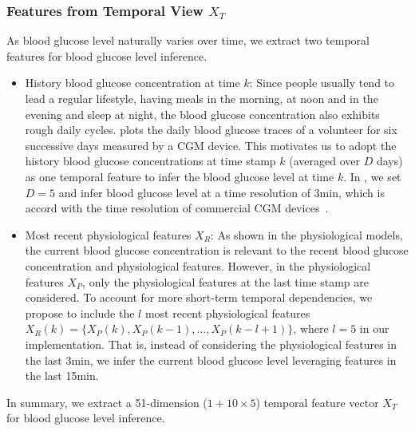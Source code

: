\subsubsection{Features from Temporal View $X_T$}
As blood glucose level naturally varies over time, we extract two temporal features for blood glucose level inference.
\begin{itemize}
  \item
  History blood glucose concentration at time $k$: 
  Since people usually tend to lead a regular lifestyle, \eg having meals in the morning, at noon and in the evening and sleep at night, the blood glucose concentration also exhibits rough daily cycles.
   plots the daily blood glucose traces of a volunteer for six successive days measured by a CGM device.
  This motivates us to adopt the history blood glucose concentrations at time stamp $k$ (averaged over $D$ days) as one temporal feature to infer the blood glucose level at time $k$.
  In \sysname, we set $D=5$ and infer blood glucose level at a time resolution of 3min, which is accord with the time resolution of commercial CGM devices~\cite{bib:CGM_wave}.
  \item
  Most recent physiological features $X_R$:
  As shown in the physiological models, the current blood glucose concentration is relevant to the recent blood glucose concentration and physiological features.
  However, in the physiological features $X_P$, only the physiological features at the last time stamp are considered. 
  To account for more short-term temporal dependencies, we propose to include the $l$ most recent physiological features $X_R(k) = \{X_P(k), X_P(k-1), \ldots, X_P(k-l+1)\}$, where $l=5$ in our implementation.
  That is, instead of considering the physiological features in the last 3min, we infer the current blood glucose level leveraging features in the last 15min.
\end{itemize}
In summary, we extract a 51-dimension ($1+10\times 5$) temporal feature vector $X_T$ for blood glucose level inference.


